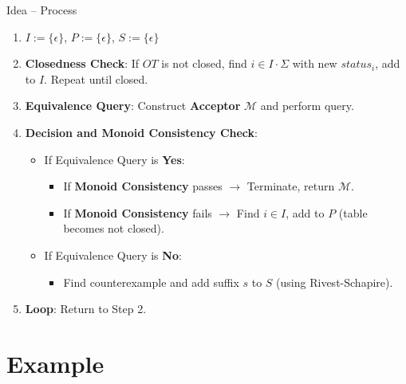 \documentclass{beamer}
\begin{document}
\begin{frame}{Idea -- Process}
\begin{enumerate}
    \item $I := \{\epsilon\}$, $P:=\{\epsilon\}$, $S:= \{\epsilon\}$
    \item \textbf{Closedness Check}: If $OT$ is not closed, find $i \in I\cdot\Sigma $ with new $status_i$, add to $I$. Repeat until closed.
    \item \textbf{Equivalence Query}: Construct \textbf{Acceptor} $\mathcal{M}$ and perform query.
    \item \textbf{Decision and Monoid Consistency Check}:
    \begin{itemize}
        \item If Equivalence Query is \textbf{Yes}:
        \begin{itemize}
            \item If \textbf{Monoid Consistency} passes $\rightarrow$ Terminate, return $\mathcal{M}$.
            \item If \textbf{Monoid Consistency} fails $\rightarrow$ Find $i \in I$, add to $P$ (table becomes not closed).
        \end{itemize}
        \item If Equivalence Query is \textbf{No}:
        \begin{itemize}
            \item Find counterexample and add suffix $s$ to $S$ (using Rivest-Schapire).
        \end{itemize}
    \end{itemize}
    \item \textbf{Loop}: Return to Step 2.
\end{enumerate}
\end{frame}

\section{Example}



\end{document}
